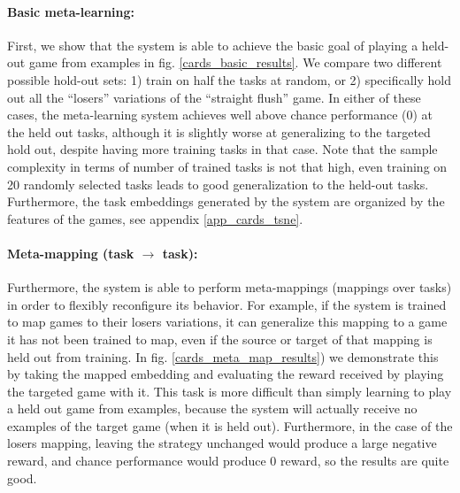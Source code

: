 \documentclass{article}
\begin{document}
\paragraph{Basic meta-learning:} First, we show that the system is able to achieve the basic goal of playing a held-out game from examples in fig. \ref{cards_basic_results}. We compare two different possible hold-out sets: 1) train on half the tasks at random, or 2) specifically hold out all the ``losers'' variations of the ``straight flush'' game. In either of these cases, the meta-learning system achieves well above chance performance (0) at the held out tasks, although it is slightly worse at generalizing to the targeted hold out, despite having more training tasks in that case. Note that the sample complexity in terms of number of trained tasks is not that high, even training on 20 randomly selected tasks leads to good generalization to the held-out tasks. Furthermore, the task embeddings generated by the system are organized by the features of the games, see appendix \ref{app_cards_tsne}. \par
\vspace{-0.7em}
\paragraph{Meta-mapping (task $\rightarrow$ task):} Furthermore, the system is able to perform meta-mappings (mappings over tasks) in order to flexibly reconfigure its behavior. For example, if the system is trained to map games to their losers variations, it can generalize this mapping to a game it has not been trained to map, even if the source or target of that mapping is held out from training. In fig. \ref{cards_meta_map_results}) we demonstrate this by taking the mapped embedding and evaluating the reward received by playing the targeted game with it. This task is more difficult than simply learning to play a held out game from examples, because the system will actually receive no examples of the target game (when it is held out). Furthermore, in the case of the losers mapping, leaving the strategy unchanged would produce a large negative reward, and chance performance would produce 0 reward, so the results are quite good. \par
\end{document}
